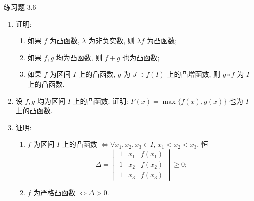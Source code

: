\begin{exblock}{练习题 3.6}
\begin{enumerate}
  \item 证明:
  \begin{enumerate}[label=(\arabic*)]
    \item 如果 $f$ 为凸函数, $\lambda$ 为非负实数, 则 $\lambda f$ 为凸函数;
    \item 如果 $f,g$ 均为凸函数, 则 $f+g$ 也为凸函数;
    \item 如果 $f$ 为区间 $I$ 上的凸函数, $g$ 为 $J\supset f(I)$ 上的凸增函数, 则 $g\circ f$ 为 $I$ 上的凸函数.
  \end{enumerate}

  \item 设 $f,g$ 均为区间 $I$ 上的凸函数. 证明: $F(x)=\max\{f(x),g(x)\}$ 也为 $I$ 上的凸函数.

  \item 证明:
  \begin{enumerate}[label=(\arabic*)]
    \item $f$ 为区间 $I$ 上的凸函数 $\Longleftrightarrow \forall x_{1},x_{2},x_{3}\in I$, $x_{1}<x_{2}<x_{3}$, 恒
    \[
    \Delta=\begin{vmatrix}
    1 & x_{1} & f(x_{1})\\
    1 & x_{2} & f(x_{2})\\
    1 & x_{3} & f(x_{3})
\end{vmatrix}\geqslant 0;
\]
    \item $f$ 为严格凸函数 $\Longleftrightarrow \Delta>0$.
  \end{enumerate}
\end{enumerate}
\end{exblock}

